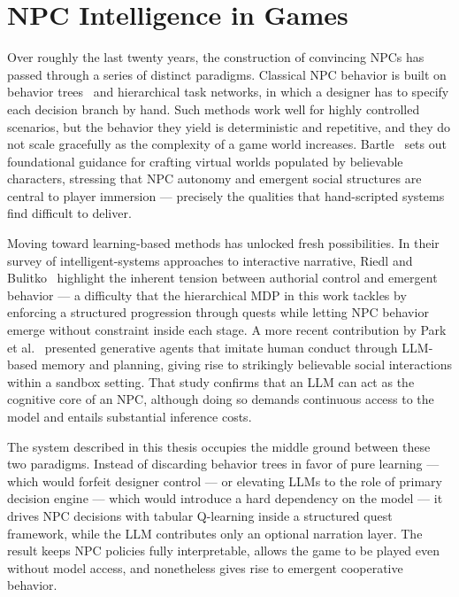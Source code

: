 \documentclass[12pt, a4paper, oneside]{report}
\begin{document}
\section{NPC Intelligence in Games}
\label{sec:npc-intelligence}

Over roughly the last twenty years, the construction of convincing NPCs has passed through a series of distinct paradigms. Classical NPC behavior is built on behavior trees~\cite{isla2005bt} and hierarchical task networks, in which a designer has to specify each decision branch by hand. Such methods work well for highly controlled scenarios, but the behavior they yield is deterministic and repetitive, and they do not scale gracefully as the complexity of a game world increases. Bartle~\cite{bartle2004worlds} sets out foundational guidance for crafting virtual worlds populated by believable characters, stressing that NPC autonomy and emergent social structures are central to player immersion --- precisely the qualities that hand-scripted systems find difficult to deliver.

Moving toward learning-based methods has unlocked fresh possibilities. In their survey of intelligent-systems approaches to interactive narrative, Riedl and Bulitko~\cite{riedl2013interactive} highlight the inherent tension between authorial control and emergent behavior --- a difficulty that the hierarchical MDP in this work tackles by enforcing a structured progression through quests while letting NPC behavior emerge without constraint inside each stage. A more recent contribution by Park et al.~\cite{park2023generative} presented generative agents that imitate human conduct through LLM-based memory and planning, giving rise to strikingly believable social interactions within a sandbox setting. That study confirms that an LLM can act as the cognitive core of an NPC, although doing so demands continuous access to the model and entails substantial inference costs.

The system described in this thesis occupies the middle ground between these two paradigms. Instead of discarding behavior trees in favor of pure learning --- which would forfeit designer control --- or elevating LLMs to the role of primary decision engine --- which would introduce a hard dependency on the model --- it drives NPC decisions with tabular Q-learning inside a structured quest framework, while the LLM contributes only an optional narration layer. The result keeps NPC policies fully interpretable, allows the game to be played even without model access, and nonetheless gives rise to emergent cooperative behavior.
\end{document}

